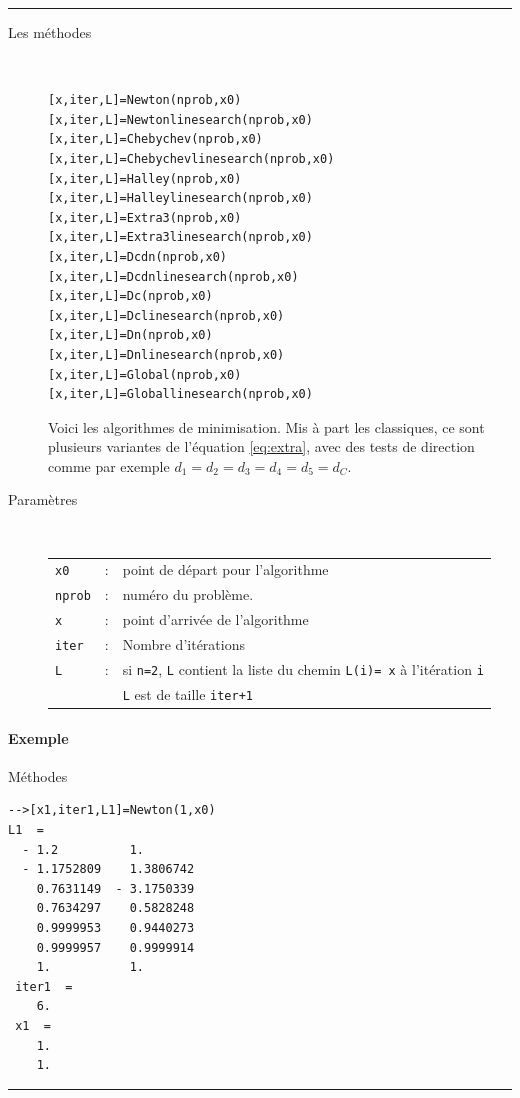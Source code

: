 \rule{\linewidth}{1pt}
\begin{description}
  \item[Les méthodes] \hfill \\
\begin{verbatim}
[x,iter,L]=Newton(nprob,x0)
[x,iter,L]=Newtonlinesearch(nprob,x0)
[x,iter,L]=Chebychev(nprob,x0)
[x,iter,L]=Chebychevlinesearch(nprob,x0)
[x,iter,L]=Halley(nprob,x0)
[x,iter,L]=Halleylinesearch(nprob,x0)
[x,iter,L]=Extra3(nprob,x0)
[x,iter,L]=Extra3linesearch(nprob,x0)
[x,iter,L]=Dcdn(nprob,x0)
[x,iter,L]=Dcdnlinesearch(nprob,x0)
[x,iter,L]=Dc(nprob,x0)
[x,iter,L]=Dclinesearch(nprob,x0)
[x,iter,L]=Dn(nprob,x0)
[x,iter,L]=Dnlinesearch(nprob,x0)
[x,iter,L]=Global(nprob,x0)
[x,iter,L]=Globallinesearch(nprob,x0)
\end{verbatim}
Voici les algorithmes de minimisation. Mis à part les classiques, ce sont plusieurs variantes 
de l'équation \eqref{eq:extra}, avec des tests de direction comme par exemple $d_1=d_2=d_3=d_4=d_5=d_C$.


  \item[Paramètres] \hfill \\
\begin{tabular}{lll}
{\tt x0}&:&point de départ pour l'algorithme\\
{\tt nprob}&:&numéro du problème.\\
{\tt x}&:&point d'arrivée de l'algorithme\\
{\tt iter}&:&Nombre d'itérations\\
{\tt L}&:&si {\tt n=2}, {\tt L} contient la liste du chemin {\tt L(i)= x} à l'itération {\tt i}\\
&& {\tt L} est de taille {\tt iter+1}
\end{tabular}
\end{description}

\paragraph{Exemple}{}Méthodes \\
\begin{verbatim} 
-->[x1,iter1,L1]=Newton(1,x0)
L1  =
  - 1.2          1.         
  - 1.1752809    1.3806742  
    0.7631149  - 3.1750339  
    0.7634297    0.5828248  
    0.9999953    0.9440273  
    0.9999957    0.9999914  
    1.           1.         
 iter1  =
    6.  
 x1  =
    1.  
    1.  
\end{verbatim}

\rule{\linewidth}{1pt}


